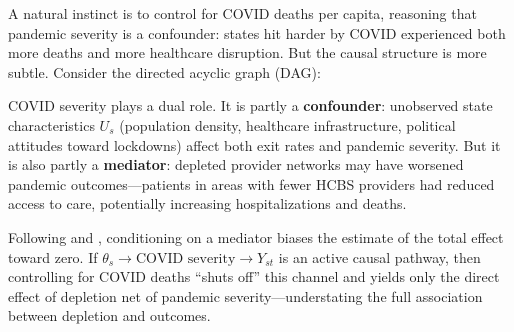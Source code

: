 \documentclass[12pt]{article}
\begin{document}
A natural instinct is to control for COVID deaths per capita, reasoning that pandemic severity is a confounder: states hit harder by COVID experienced both more deaths and more healthcare disruption. But the causal structure is more subtle. Consider the directed acyclic graph (DAG):

\begin{center}
\end{center}

COVID severity plays a dual role. It is partly a \textbf{confounder}: unobserved state characteristics $U_s$ (population density, healthcare infrastructure, political attitudes toward lockdowns) affect both exit rates and pandemic severity. But it is also partly a \textbf{mediator}: depleted provider networks may have worsened pandemic outcomes---patients in areas with fewer HCBS providers had reduced access to care, potentially increasing hospitalizations and deaths.

Following \citet{angrist2009} and \citet{pearl2009}, conditioning on a mediator biases the estimate of the total effect toward zero. If $\theta_s \to \text{COVID severity} \to Y_{st}$ is an active causal pathway, then controlling for COVID deaths ``shuts off'' this channel and yields only the direct effect of depletion net of pandemic severity---understating the full association between depletion and outcomes.
\end{document}

